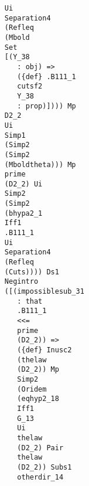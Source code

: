 \documentclass[12pt]{article}
\begin{document}
\begin{verbatim}
                                           Ui 
                                           Separation4 
                                           (Refleq 
                                           (Mbold 
                                           Set 
                                           [(Y_38 
                                              : obj) => 
                                              ({def} .B111_1 
                                              cutsf2 
                                              Y_38 
                                              : prop)]))) Mp 
                                           D2_2 
                                           Ui 
                                           Simp1 
                                           (Simp2 
                                           (Simp2 
                                           (Mboldtheta))) Mp 
                                           prime 
                                           (D2_2) Ui 
                                           Simp2 
                                           (Simp2 
                                           (bhypa2_1 
                                           Iff1 
                                           .B111_1 
                                           Ui 
                                           Separation4 
                                           (Refleq 
                                           (Cuts)))) Ds1 
                                           Negintro 
                                           ([(impossiblesub_31 
                                              : that 
                                              .B111_1 
                                              <<= 
                                              prime 
                                              (D2_2)) => 
                                              ({def} Inusc2 
                                              (thelaw 
                                              (D2_2)) Mp 
                                              Simp2 
                                              (Oridem 
                                              (eqhyp2_18 
                                              Iff1 
                                              G_13 
                                              Ui 
                                              thelaw 
                                              (D2_2) Pair 
                                              thelaw 
                                              (D2_2)) Subs1 
                                              otherdir_14 

\end{verbatim}
\end{document}
